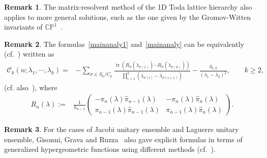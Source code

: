 \documentclass[a4paper]{article}
\theoremstyle{plain}
\theoremstyle{definition}
\newtheorem{remark}{Remark}
\DeclareMathOperator{\tr}{tr}
\begin{document}
\begin{remark}
	The matrix-resolvent method of the 1D Toda lattice hierarchy also applies to more general solutions, such as the one given by the Gromov-Witten invariants of $\mathbb{CP}^1$~\cite{DY,DYZcp1,Toda}.
\end{remark}

\begin{remark}
The formulas~\eqref{mainanaly1} and~\eqref{mainanaly} can be equivalently (cf.~\cite{BE,DY,DYZcp1,Toda,Ruzza,Laguerre,JUE,corJUE,LUE}) written as
\begin{align}
	\mathcal C_k(n;\lambda_1,\cdots,\lambda_k)=&-\sum_{\sigma\in S_k/C_k}\frac{\tr(R_n(\lambda_{\sigma(1)})\cdots R_n(\lambda_{\sigma(k)}))}{\prod_{i=1}^k(\lambda_{\sigma(i)}-\lambda_{\sigma(i+1)})}-\frac{\delta_{k,2}}{(\lambda_1-\lambda_2)^2},\qquad k\ge2,
\end{align}
(cf. also~\cite{BDY,BDYds}), where
\begin{align}
	R_n(\lambda):=&\frac{1}{h_{n-1}}\begin{pmatrix}
		-\pi_n(\lambda)\widehat\pi_{n-1}(\lambda)&-\pi_n(\lambda)\widehat\pi_n(\lambda)\\ 
		\pi_{n-1}(\lambda)\widehat\pi_{n-1}(\lambda)&\pi_{n-1}(\lambda)\widehat\pi_n(\lambda)
	\end{pmatrix}.
\end{align}
\end{remark}

\begin{remark}
For the cases of Jacobi unitary ensemble and Laguerre unitary ensemble, Gisonni, Grava and Ruzza~\cite{Laguerre,JUE,corJUE} also gave explicit formulas in terms of generalized hypergeometric functions using different methods (cf.~\cite{LUE}).
\end{remark}
	
\end{document}
